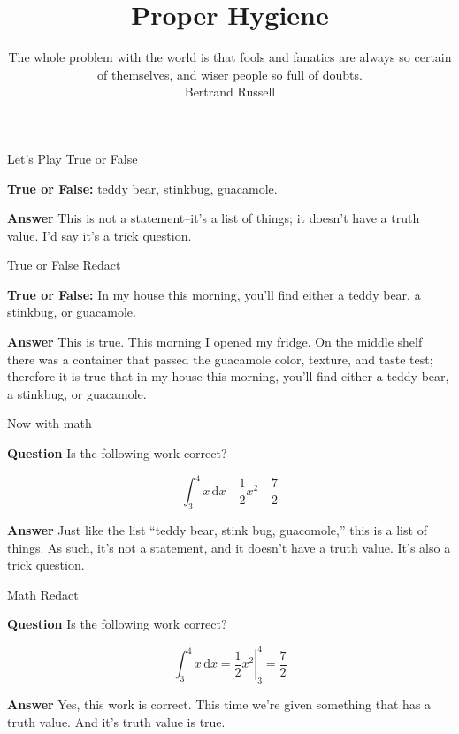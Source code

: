 \documentclass[fleqn]{beamer}
\subtitle{The whole problem with the world is that fools and fanatics are always so certain of themselves, and wiser people so full of doubts. \\ \vspace{0.25in} Bertrand Russell}
\title{\textbf{Proper Hygiene}}
\date{}
\theoremstyle{definition}
\begin{document}
\frame{\titlepage}

\begin{frame}{Let's Play True or False}

    \textbf{True or False:} teddy bear, stinkbug, guacamole.

    \vspace{0.5in}
    \textbf{Answer} This is not a statement--it's a list of things; it doesn't 
    have a truth value. I'd say it's a trick question.

\vfill 
\end{frame}

\begin{frame}{True or False Redact}

  \textbf{True or False:} In my house this morning, you'll 
  find either a teddy bear, a stinkbug, or guacamole.

  \vspace{0.5in}
  \textbf{Answer} This is true. This morning I opened my fridge. On the
  middle shelf there was a container that passed the guacamole color,
  texture, and taste test; therefore it is true that in my house this morning, you'll 
  find either a teddy bear, a stinkbug, or guacamole.

\vfill 
\end{frame}

\begin{frame}{Now with math}

  \textbf{Question} Is the following work correct?

  \begin{equation*}
    \int_3^4 x \, \mathrm{d}x \quad 
     \frac{1}{2} x^{2} \quad \frac{7}{2}
  \end{equation*}

  \vspace{0.5in}
  \textbf{Answer} Just like the list ``teddy bear, stink bug, 
  guacomole,''
  this is a list of things. As such, it's not 
  a statement, and it doesn't have a truth value. It's also a trick 
  question.
  \vfill 
\end{frame}

\begin{frame}{Math Redact}

  \textbf{Question} Is the following work correct?

  \begin{equation*}
    \int_3^4 x \, \mathrm{d}x =
     \left. \frac{1}{2} x^{2} \right |_{3}^4 = \frac{7}{2}
  \end{equation*}

  \vspace{0.5in}
  \textbf{Answer} Yes, this work is correct. This time we're 
  given something that has a truth value. And it's truth value is
  true.

  \vfill
\end{frame}
\end{document}

